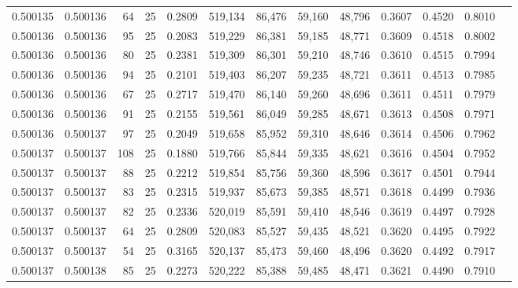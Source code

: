 \begin{tabular}{rrrrrrrrrrrrr}
0.500135 & 0.500136 &    64 &  25 &                                     0.2809 & 519,134 &  86,476 &  59,160 &  48,796 & 0.3607 & 0.4520 & 0.8010 \\
0.500136 & 0.500136 &    95 &  25 &                                     0.2083 & 519,229 &  86,381 &  59,185 &  48,771 & 0.3609 & 0.4518 & 0.8002 \\
0.500136 & 0.500136 &    80 &  25 &                                     0.2381 & 519,309 &  86,301 &  59,210 &  48,746 & 0.3610 & 0.4515 & 0.7994 \\
0.500136 & 0.500136 &    94 &  25 &                                     0.2101 & 519,403 &  86,207 &  59,235 &  48,721 & 0.3611 & 0.4513 & 0.7985 \\
0.500136 & 0.500136 &    67 &  25 &                                     0.2717 & 519,470 &  86,140 &  59,260 &  48,696 & 0.3611 & 0.4511 & 0.7979 \\
0.500136 & 0.500136 &    91 &  25 &                                     0.2155 & 519,561 &  86,049 &  59,285 &  48,671 & 0.3613 & 0.4508 & 0.7971 \\
0.500136 & 0.500137 &    97 &  25 &                                     0.2049 & 519,658 &  85,952 &  59,310 &  48,646 & 0.3614 & 0.4506 & 0.7962 \\
0.500137 & 0.500137 &   108 &  25 &                                     0.1880 & 519,766 &  85,844 &  59,335 &  48,621 & 0.3616 & 0.4504 & 0.7952 \\
0.500137 & 0.500137 &    88 &  25 &                                     0.2212 & 519,854 &  85,756 &  59,360 &  48,596 & 0.3617 & 0.4501 & 0.7944 \\
0.500137 & 0.500137 &    83 &  25 &                                     0.2315 & 519,937 &  85,673 &  59,385 &  48,571 & 0.3618 & 0.4499 & 0.7936 \\
0.500137 & 0.500137 &    82 &  25 &                                     0.2336 & 520,019 &  85,591 &  59,410 &  48,546 & 0.3619 & 0.4497 & 0.7928 \\
0.500137 & 0.500137 &    64 &  25 &                                     0.2809 & 520,083 &  85,527 &  59,435 &  48,521 & 0.3620 & 0.4495 & 0.7922 \\
0.500137 & 0.500137 &    54 &  25 &                                     0.3165 & 520,137 &  85,473 &  59,460 &  48,496 & 0.3620 & 0.4492 & 0.7917 \\
0.500137 & 0.500138 &    85 &  25 &                                     0.2273 & 520,222 &  85,388 &  59,485 &  48,471 & 0.3621 & 0.4490 & 0.7910 \\

\end{tabular}
